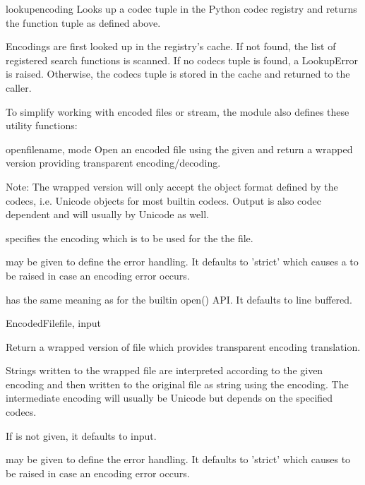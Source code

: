 \begin{funcdesc}{lookup}{encoding}
Looks up a codec tuple in the Python codec registry and returns the
function tuple as defined above.

Encodings are first looked up in the registry's cache. If not found,
the list of registered search functions is scanned. If no codecs tuple
is found, a LookupError is raised. Otherwise, the codecs tuple is
stored in the cache and returned to the caller.
\end{funcdesc}

To simplify working with encoded files or stream, the module
also defines these utility functions:

\begin{funcdesc}{open}{filename, mode}
Open an encoded file using the given  and return
a wrapped version providing transparent encoding/decoding.

Note: The wrapped version will only accept the object format defined
by the codecs, i.e. Unicode objects for most builtin codecs. Output is
also codec dependent and will usually by Unicode as well.

 specifies the encoding which is to be used for the
the file.

 may be given to define the error handling. It defaults
to 'strict' which causes a  to be raised in case
an encoding error occurs.

 has the same meaning as for the builtin open() API.
It defaults to line buffered.
\end{funcdesc}

\begin{funcdesc}{EncodedFile}{file, input}

Return a wrapped version of file which provides transparent
encoding translation.

Strings written to the wrapped file are interpreted according to the
given  encoding and then written to the original file as
string using the  encoding. The intermediate encoding will
usually be Unicode but depends on the specified codecs.

If  is not given, it defaults to input.

 may be given to define the error handling. It defaults to
'strict' which causes  to be raised in case
an encoding error occurs.
\end{funcdesc}



